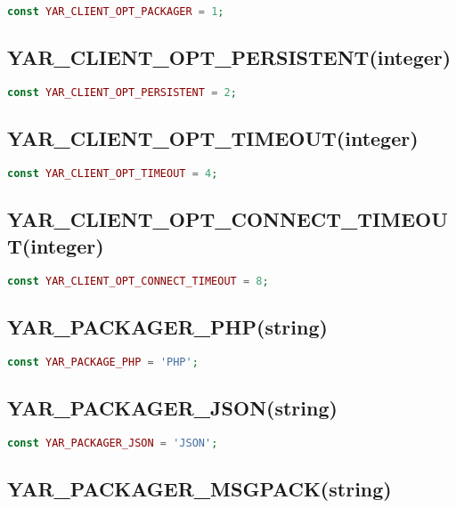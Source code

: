 \begin{lstlisting}[language=PHP]
const YAR_CLIENT_OPT_PACKAGER = 1;
\end{lstlisting}

\subsection{YAR\_CLIENT\_OPT\_PERSISTENT(integer)}

\begin{lstlisting}[language=PHP]
const YAR_CLIENT_OPT_PERSISTENT = 2;
\end{lstlisting}

\subsection{YAR\_CLIENT\_OPT\_TIMEOUT(integer)}

\begin{lstlisting}[language=PHP]
const YAR_CLIENT_OPT_TIMEOUT = 4;
\end{lstlisting}

\subsection{YAR\_CLIENT\_OPT\_CONNECT\_TIMEOUT(integer)}

\begin{lstlisting}[language=PHP]
const YAR_CLIENT_OPT_CONNECT_TIMEOUT = 8;
\end{lstlisting}

\subsection{YAR\_PACKAGER\_PHP(string)}

\begin{lstlisting}[language=PHP]
const YAR_PACKAGE_PHP = 'PHP';
\end{lstlisting}

\subsection{YAR\_PACKAGER\_JSON(string)}

\begin{lstlisting}[language=PHP]
const YAR_PACKAGER_JSON = 'JSON';
\end{lstlisting}

\subsection{YAR\_PACKAGER\_MSGPACK(string)}

